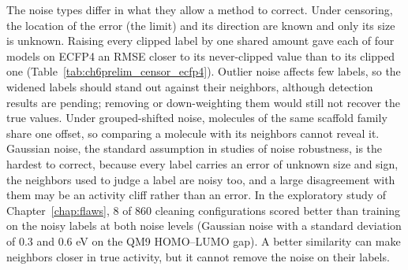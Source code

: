 The noise types differ in what they allow a method to correct. Under censoring, the location of the error (the limit) and its direction are known and only its size is unknown. Raising every clipped label by one shared amount gave each of four models on ECFP4 an RMSE closer to its never-clipped value than to its clipped one (Table~\ref{tab:ch6prelim_censor_ecfp4}). Outlier noise affects few labels, so the widened labels should stand out against their neighbors, although detection results are pending; removing or down-weighting them would still not recover the true values. Under grouped-shifted noise, molecules of the same scaffold family share one offset, so comparing a molecule with its neighbors cannot reveal it. Gaussian noise, the standard assumption in studies of noise robustness, is the hardest to correct, because every label carries an error of unknown size and sign, the neighbors used to judge a label are noisy too, and a large disagreement with them may be an activity cliff rather than an error. In the exploratory study of Chapter~\ref{chap:flaws}, 8 of 860 cleaning configurations scored better than training on the noisy labels at both noise levels (Gaussian noise with a standard deviation of 0.3 and 0.6 eV on the QM9 HOMO--LUMO gap). A better similarity can make neighbors closer in true activity, but it cannot remove the noise on their labels.


